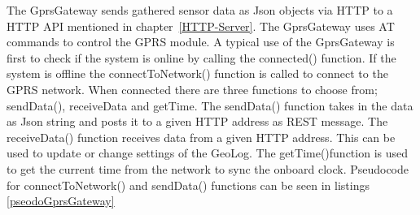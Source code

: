 The GprsGateway sends gathered sensor data as Json objects via HTTP to a HTTP API
mentioned in chapter~\ref{HTTP-Server}. The GprsGateway uses AT commands\cite{ATcommands} to control the GPRS module. A typical use of the GprsGateway is first to check if the system is online by calling the connected() function. If the system is offline the 
connectToNetwork() function is called to connect to the GPRS network. When connected 
there are three functions to choose from; sendData(), receiveData and getTime. The 
sendData() function takes in the data as Json string and posts it to a given HTTP address
as REST\cite{rest} message. The receiveData() function receives data from a given HTTP
address. This can be used to update or change settings of the GeoLog. The getTime()function is used to get the current time from the network to sync the onboard clock.
Pseudocode for connectToNetwork() and sendData() functions can be seen in listings 
\ref{pseodoGprsGateway}

